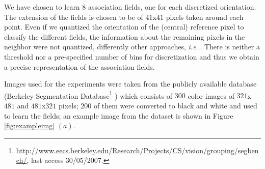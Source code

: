 \documentclass{llncs}
\makeatletter
\DeclareRobustCommand\onedot{\futurelet\@let@token\@onedot}
\def\@onedot{\ifx\@let@token.\else.\null\fi\xspace}
\def\ie{\emph{i.e}\onedot} \def\Ie{\emph{I.e}\onedot}
\makeatother
\begin{document}

We have chosen to learn $8$ association fields, one for each discretized
orientation. The extension of the fields is chosen to be of $41$x$41$ pixels
taken around each point.
Even if we quantized the orientation of the (central)
reference pixel to classify the different fields, the information about the remaining
pixels in the neighbor were not quantized, differently other approaches, \ie \cite{Sigman01}.
There is neither a threshold nor a pre-specified number of bins for
discretization and thus we obtain a precise representation of the association fields.

Images used for the experiments were taken from the
publicly available database (Berkeley Segmentation
Database\footnote{\url{http://www.eecs.berkeley.edu/Research/Projects/CS/vision/grouping/segbench/}, last access 30/05/2007.}
\cite{MartinFTM01}) which consists of $300$
color images of $321$x$481$ and $481$x$321$ pixels;
$200$ of them were converted to black and white and used
to learn the fields; an
example image from the dataset is shown in Figure \ref{fig:exampleimg} $(a)$.
\end{document}
